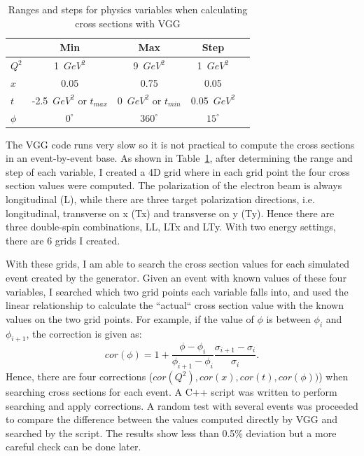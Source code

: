 \documentclass[a4paper,10.5pt]{article}
\begin{document}
\begin{table}[htbp]
  \begin{center}
 \begin{tabular}{|l|c|c|c|c|}
 \toprule
                &    Min   &   Max   &   Step\\
 \midrule
  $Q^{2}$       & 1~$GeV^{2}$ & 9~$GeV^{2}$ & 1~$GeV^{2}$ \\
  $x$           & 0.05 & 0.75 & 0.05 \\
   $t$          & -2.5~$GeV^{2}$ or $t_{max}$ & 0~$GeV^{2}$ or $t_{min}$ & 0.05~$GeV^{2}$ \\
  $\phi$        & $0^{\circ}$ & $360^{\circ}$ & $15^{\circ}$ \\
 \bottomrule
 \end{tabular}
\caption{Ranges and steps for physics variables when calculating cross sections with VGG}
\label{vgg_table}
  \end{center}
\end{table}

  The VGG code runs very slow so it is not practical to compute the cross sections in an event-by-event base. As shown in Table~\ref{vgg_table}, after determining the range and step of each variable, I created a 4D grid where in each grid point the four cross section values were computed. The polarization of the electron beam is always longitudinal (L), while there are three target polarization directions, i.e. longitudinal, transverse on x (Tx) and transverse on y (Ty). Hence there are three double-spin combinations, LL, LTx and LTy. With two energy settings, there are 6 grids I created.
  
  With these grids, I am able to search the cross section values for each simulated event created by the generator. Given an event with known values of these four variables, I searched which two grid points each variable falls into, and used the linear relationship to calculate the ``actual`` cross section value with the known values on the two grid points. For example, if the value of $\phi$ is between $\phi_{i}$ and $\phi_{i+1}$, the correction is given as:
  \begin{equation}
     cor(\phi) = 1 + \frac{\phi-\phi_{i}}{\phi_{i+1}-\phi_{i}}\frac{\sigma_{i+1}-\sigma_{i}}{\sigma_{i}}.
  \end{equation}
  Hence, there are four corrections ($cor(Q^{2}), cor(x), cor(t), cor(\phi))$) when searching cross sections for each event. A C++ script was written to perform searching and apply corrections. A random test with several events was proceeded to compare the difference between the values computed directly by VGG and searched by the script. The results show less than 0.5\% deviation but a more careful check can be done later.
 
\end{document}
